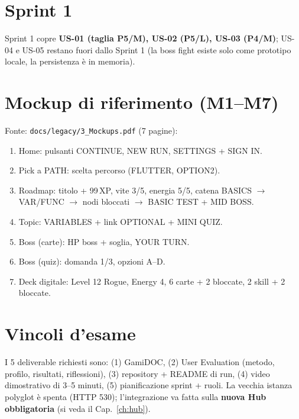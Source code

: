 \section{Sprint 1}
Sprint 1 copre \textbf{US-01 (taglia P5/M), US-02 (P5/L), US-03 (P4/M)};
US-04 e US-05 restano fuori dallo Sprint 1 (la boss fight esiste solo come
prototipo locale, la persistenza è in memoria).

\section{Mockup di riferimento (M1--M7)}
Fonte: \texttt{docs/legacy/3\_Mockups.pdf} (7 pagine):
\begin{enumerate}[label=M\arabic*.]
\item Home: pulsanti CONTINUE, NEW RUN, SETTINGS + SIGN IN.
\item Pick a PATH: scelta percorso (FLUTTER, OPTION2).
\item Roadmap: titolo + 99\,XP, vite 3/5, energia 5/5, catena
BASICS $\rightarrow$ VAR/FUNC $\rightarrow$ nodi bloccati $\rightarrow$
BASIC TEST + MID BOSS.
\item Topic: VARIABLES + link OPTIONAL + MINI QUIZ.
\item Boss (carte): HP boss + soglia, YOUR TURN.
\item Boss (quiz): domanda 1/3, opzioni A--D.
\item Deck digitale: Level 12 Rogue, Energy 4, 6 carte + 2 bloccate,
2 skill + 2 bloccate.
\end{enumerate}

\section{Vincoli d'esame}
I 5 deliverable richiesti sono: (1) GamiDOC, (2) User Evaluation
(metodo, profilo, risultati, riflessioni), (3) repository + README di run,
(4) video dimostrativo di 3--5 minuti, (5) pianificazione sprint + ruoli.
La vecchia istanza polyglot è spenta (HTTP 530); l'integrazione va fatta
sulla \textbf{nuova Hub obbligatoria} (si veda il Cap.~\ref{ch:hub}).
